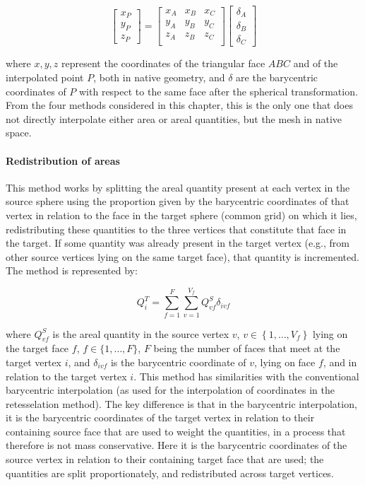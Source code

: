 $$
\left[
\begin{array}{c}
x_{P} \\
y_{P} \\
z_{P}
\end{array} \right] = \left[
\begin{array}{ccc}
x_{A} & x_{B} & x_{C} \\
y_{A} & y_{B} & y_{C} \\
z_{A} & z_{B} & z_{C} \\
\end{array}
\right] \left[
\begin{array}{c}
\delta_{A} \\
\delta_{B} \\
\delta_{C}
\end{array} \right]
$$

\noindent
where $x,y,z$ represent the coordinates of the triangular face $ABC$ and of the interpolated point $P$, both in native geometry, and $\delta$ are the barycentric coordinates of $P$ with respect to the same face after the spherical transformation. From the four methods considered in this chapter, this is the only one that does not directly interpolate either area or areal quantities, but the mesh in native space.

\paragraph{Redistribution of areas}

This method works by splitting the areal quantity present at each vertex in the source sphere using the proportion given by the barycentric coordinates of that vertex in relation to the face in the target sphere (common grid) on which it lies, redistributing these quantities to the three vertices that constitute that face in the target. If some quantity was already present in the target vertex (e.g., from other source vertices lying on the same target face), that quantity is incremented. The method is represented by:

$$
Q^T_i = \sum_{f=1}^F\sum_{v=1}^{V_f} Q^S_{vf}\delta_{ivf}
$$

\noindent
where $Q^S_{vf}$ is the areal quantity in the source vertex $v$, $v\in\left\{1, \ldots, V_f \right\}$ lying on the target face $f$, $f\in\{1,\ldots,F\}$, $F$ being the number of faces that meet at the target vertex $i$, and $\delta_{ivf}$ is the barycentric coordinate of $v$, lying on face $f$, and in relation to the target vertex $i$. This method has similarities with the conventional barycentric interpolation (as used for the interpolation of coordinates in the retesselation method). The key difference is that in the barycentric interpolation, it is the barycentric coordinates of the target vertex in relation to their containing source face that are used to weight the quantities, in a process that therefore is not mass conservative. Here it is the barycentric coordinates of the source vertex in relation to their containing target face that are used; the quantities are split proportionately, and redistributed across target vertices.


